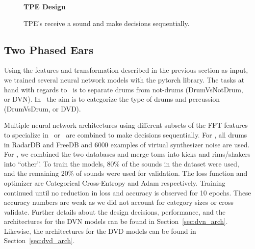 \documentclass[\main/thesis.tex]{subfiles}
\begin{document}
\label{TPE_models}
\begin{figure}[tbp]
    \begin{center}
    \textbf{TPE Design}
    \end{center}
    \caption{TPE's receive a sound and make decisions sequentially.}
\label{fig:TPE_design}
\end{figure}

\subsection{Two Phased Ears}

Using the features and transformation described in the previous section as input, we trained several neural network models with the pytorch library. The tasks at hand with regards to \decfirst~is to separate drums from not-drums (DrumVsNotDrum, or DVN). In \decsecond~the aim is to categorize the type of drums and percussion (DrumVsDrum, or DVD). 

 Multiple neural network architectures using different subsets of the FFT features to specialize in \decfirst~or \decsecond~are combined to make decisions sequentially. For \decfirst, all drums in RadarDB and FreeDB and 6000 examples of virtual synthesizer noise are used. For \decsecond, we combined the two databases and merge toms into kicks and rims/shakers into \enquote{other}. To train the models, 80\% of the sounds in the dataset were used, and the remaining 20\% of sounds were used for validation. The loss function and optimizer are Categorical Cross-Entropy and Adam respectively. Training continued until no reduction in loss and accuracy is observed for 10 epochs. These accuracy numbers are weak as we did not account for category sizes or cross validate. Further details about the design decisions, performance, and the architectures for the DVN models can be found in Section~\ref{sec:dvn_arch}. Likewise, the architectures for the DVD models can be found in Section~\ref{sec:dvd_arch}.
\end{document}
